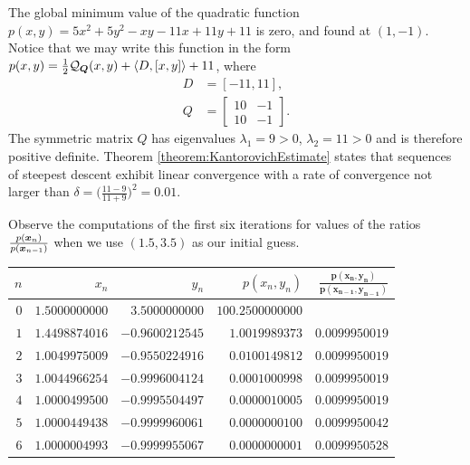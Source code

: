 \begin{example}\label{example:SDconvergenceRate}
The global minimum value of the quadratic function $p(x,y) = 5x^2 + 5y^2 -xy -11x +11y +11$ is zero, and found at $(1,-1)$.  Notice that we may write this function in the form $p(x,y) = \tfrac{1}{2}\mathcal{Q}_{\boldsymbol{Q}}(x,y) + \langle D, [x,y] \rangle + 11$, where
\begin{align*}
D &= [ -11, 11], \\
Q &= \begin{bmatrix} 10 & -1 \\ 10 & -1 \end{bmatrix}.
\end{align*}
The symmetric matrix $Q$ has eigenvalues $\lambda_1 = 9 >0$, $\lambda_2 = 11 > 0$ and is therefore positive definite.  Theorem \ref{theorem:KantorovichEstimate} states that sequences of steepest descent exhibit linear convergence with a rate of convergence not larger than $\delta = \big( \tfrac{11-9}{11+9} \big)^2 = 0.01$.

Observe the computations of the first six iterations for values of the ratios $\frac{p(\boldsymbol{x}_n)}{p(\boldsymbol{x}_{n-1})}$ when we use $(1.5,3.5)$ as our initial guess.
\begin{center}
\begin{tabular}{|r|r|r|r|r|} \hline 
 $n$ & $x_n$ & $y_n$ & $p(x_n,y_n)$ & $\boldsymbol{\frac{p(x_n,y_n)}{p(x_{n-1},y_{n-1})}}$ \\ \hline \hline 
$0$ & $1.5000000000$ & $3.5000000000$ & $100.2500000000$ &  \\ \hline 
$1$ & $1.4498874016$ & $-0.9600212545$ & $1.0019989373$ & $\boldsymbol{0.0099950019}$ \\ \hline 
$2$ & $1.0049975009$ & $-0.9550224916$ & $0.0100149812$ & $\boldsymbol{0.0099950019}$ \\ \hline 
$3$ & $1.0044966254$ & $-0.9996004124$ & $0.0001000998$ & $\boldsymbol{0.0099950019}$ \\ \hline 
$4$ & $1.0000499500$ & $-0.9995504497$ & $0.0000010005$ & $\boldsymbol{0.0099950019}$ \\ \hline 
$5$ & $1.0000449438$ & $-0.9999960061$ & $0.0000000100$ & $\boldsymbol{0.0099950042}$ \\ \hline 
$6$ & $1.0000004993$ & $-0.9999955067$ & $0.0000000001$ & $\boldsymbol{0.0099950528}$ \\ \hline 
\end{tabular}
\end{center}
\end{example}
